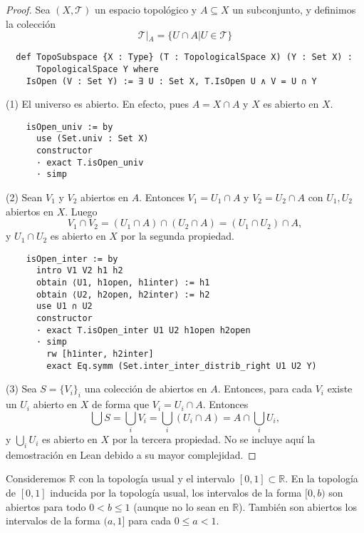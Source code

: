 \begin{proof}
  Sea $(X, \mathcal{T})$ un espacio topológico y $A \subseteq X$ un subconjunto, y definimos la colección
  $$
  \mathcal{T}|_A = \{U \cap A | U \in \mathcal{T}\}
  $$

  \begin{lstlisting}
  def TopoSubspace {X : Type} (T : TopologicalSpace X) (Y : Set X) :
      TopologicalSpace Y where
    IsOpen (V : Set Y) := ∃ U : Set X, T.IsOpen U ∧ V = U ∩ Y \end{lstlisting}
  
  (1) El universo es abierto. En efecto, pues $A = X \cap A$ y $X$ es abierto en $X$.
  
  \begin{lstlisting}
    isOpen_univ := by
      use (Set.univ : Set X)
      constructor
      · exact T.isOpen_univ
      · simp \end{lstlisting}
  
  (2) Sean $V_1$ y $V_2$ abiertos en $A$. Entonces $V_1 = U_1 \cap A$ y $V_2 = U_2 \cap A$ con $U_1, U_2$ abiertos en $X$. Luego
  $$
  V_1 \cap V_2 = (U_1 \cap A) \cap (U_2 \cap A) = (U_1 \cap U_2) \cap A,
  $$
  y $U_1 \cap U_2$ es abierto en $X$ por la segunda propiedad.

  \begin{lstlisting}
    isOpen_inter := by
      intro V1 V2 h1 h2
      obtain ⟨U1, h1open, h1inter⟩ := h1
      obtain ⟨U2, h2open, h2inter⟩ := h2
      use U1 ∩ U2
      constructor
      · exact T.isOpen_inter U1 U2 h1open h2open
      · simp
        rw [h1inter, h2inter]
        exact Eq.symm (Set.inter_inter_distrib_right U1 U2 Y) \end{lstlisting}
  
  (3) Sea $S = \{V_i\}_i$ una colección de abiertos en $A$. Entonces, para cada $V_i$ existe un $U_i$ abierto en $X$ de forma que $V_i = U_i \cap A$. Entonces
  $$
  \bigcup S = \bigcup_{i}V_i = \bigcup_{i}(U_i \cap A) = A \cap \bigcup_{i}U_i,
  $$
  y $\bigcup_{i}U_i$ es abierto en $X$ por la tercera propiedad. No se incluye aquí la demostración en Lean debido a su mayor complejidad.
\end{proof}

\begin{example}
  Consideremos $\mathbb{R}$ con la topología usual y el intervalo $[0, 1] \subset \mathbb{R}$. En la topología de $[0, 1]$ inducida por la topología usual, los intervalos de la forma $[0, b)$ son abiertos para todo $0 < b \leq 1$ (aunque no lo sean en $\mathbb{R}$). También son abiertos los intervalos de la forma $(a, 1]$ para cada $0 \leq a < 1$.
\end{example}


